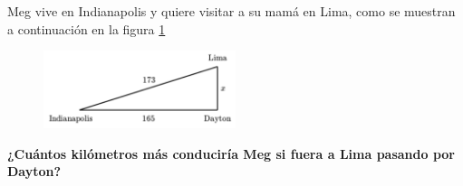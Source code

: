 Meg vive en Indianapolis y quiere visitar a su mamá en Lima,
como se muestran a continuación en la figura \ref{fig:proverb_pitagoras_07}
\begin{figure}[H]
    \begin{center}
        \includegraphics[width=0.5\textwidth]{../images/proverb_pitagoras_07}
    \end{center}
    \caption{}
    \label{fig:proverb_pitagoras_07}
\end{figure}
\textbf{¿Cuántos kilómetros más conduciría Meg si fuera a Lima pasando por Dayton?}
